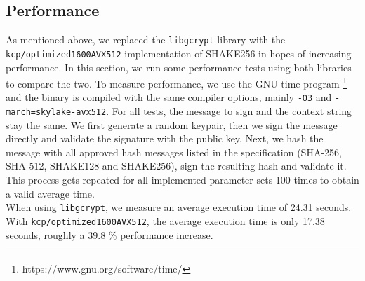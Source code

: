 \documentclass[journal=tosc,notanonymous]{iacrtrans}
\begin{document}
\subsection{Performance}

As mentioned above, we replaced the \texttt{libgcrypt} library with the \texttt{kcp/optimized1600AVX512} implementation of SHAKE256 in hopes of increasing performance.
In this section, we run some performance tests using both libraries to compare the two.
To measure performance, we use the GNU time program \footnote{https://www.gnu.org/software/time/} and the binary is compiled with the same compiler options, mainly \texttt{-O3} and \texttt{-march=skylake-avx512}.
For all tests, the message to sign and the context string stay the same.
We first generate a random keypair, then we sign the message directly and validate the signature with the public key.
Next, we hash the message with all approved hash messages listed in the specification (SHA-256, SHA-512, SHAKE128 and SHAKE256), sign the resulting hash and validate it.
This process gets repeated for all implemented parameter sets 100 times to obtain a valid average time.
\\
When using \texttt{libgcrypt}, we measure an average execution time of 24.31 seconds.
With \texttt{kcp/optimized1600AVX512}, the average execution time is only 17.38 seconds, roughly a 39.8 \% performance increase.




\end{document}

